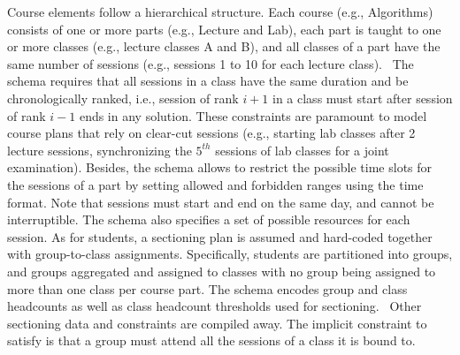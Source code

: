 Course elements follow a hierarchical structure.
Each course (e.g., Algorithms) consists of one or more parts (e.g., Lecture and Lab),
each part is taught to one or more classes (e.g., lecture classes A and B),
and all classes of a part have the same number of sessions (e.g., sessions 1 to 10 for each lecture class).
~The schema requires that all sessions in a class have the same duration
and be chronologically ranked,
i.e., session of rank $i+1$ in a class must start after session of rank $i-1$ ends in any solution.
These constraints are paramount to model course plans that rely on clear-cut sessions
(e.g., starting lab classes after 2 lecture sessions,
synchronizing the $5^{th}$ sessions of lab classes for a joint examination).
Besides, the schema allows to restrict the possible time slots for the sessions of a part
by setting allowed and forbidden ranges using the time format.
Note that 
sessions must start and end on the same day, and cannot be interruptible. %
%
The schema also specifies a set of possible resources for each session.
As for students, %
a sectioning plan
is assumed and hard-coded together with group-to-class assignments.
Specifically, 
students are partitioned into groups,
and groups aggregated and assigned to classes
with no group being assigned to more than one class per course part.
The schema encodes group and class headcounts
as well as class headcount thresholds used for sectioning.%
~Other sectioning data and constraints %
are compiled away.
The implicit constraint to satisfy %
is that a group must attend all the sessions of a class it is bound to.

